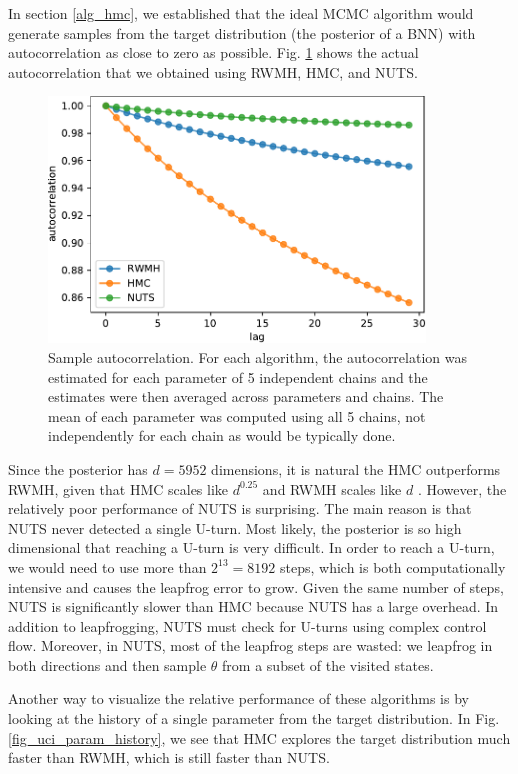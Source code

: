 \documentclass[12pt]{article}
\begin{document}
{In section \ref{alg_hmc}, we established that the ideal MCMC algorithm would generate samples from the target distribution (the posterior of a BNN) with autocorrelation as close to zero as possible. Fig. \ref{fig_uci_param_autocor} shows the actual autocorrelation that we obtained using RWMH, HMC, and NUTS.

\begin{figure}[H]
\centering
\includegraphics[width=10cm]{plots/uci_param_autocor.pdf}
\caption{Sample autocorrelation. For each algorithm, the autocorrelation was estimated for each parameter of 5 independent chains and the estimates were then averaged across parameters and chains. The mean of each parameter was computed using all 5 chains, not independently for each chain as would be typically done.}
\label{fig_uci_param_autocor}
\end{figure}

Since the posterior has $d=5952$ dimensions, it is natural the HMC outperforms RWMH, given that HMC scales like $d^{0.25}$ and RWMH scales like $d$ \cite{hmc_rwmh_scaling}. However, the relatively poor performance of NUTS is surprising. The main reason is that NUTS never detected a single U-turn. Most likely, the posterior is so high dimensional that reaching a U-turn is very difficult. In order to reach a U-turn, we would need to use more than $2^{13} = 8192$ steps, which is both computationally intensive and causes the leapfrog error to grow. Given the same number of steps, NUTS is significantly slower than HMC because NUTS has a large overhead. In addition to leapfrogging, NUTS must check for U-turns using complex control flow. Moreover, in NUTS, most of the leapfrog steps are wasted: we leapfrog in both directions and then sample $\theta$ from a subset of the visited states.

Another way to visualize the relative performance of these algorithms is by looking at the history of a single parameter from the target distribution. In Fig. \ref{fig_uci_param_history}, we see that HMC explores the target distribution much faster than RWMH, which is still faster than NUTS.

}
\end{document}

